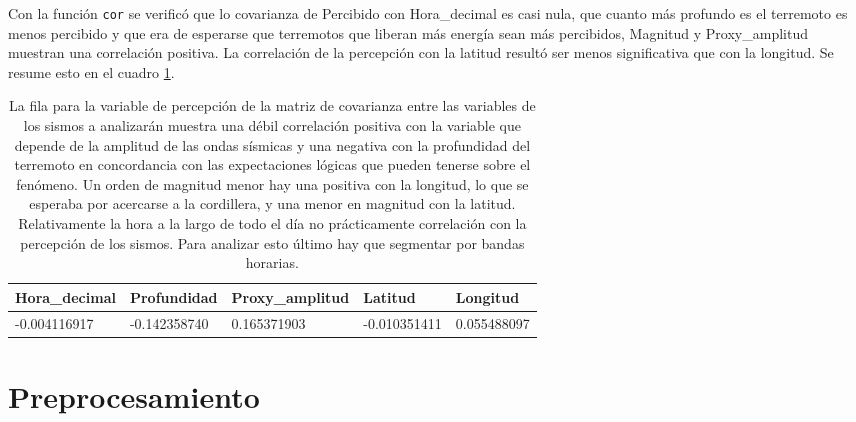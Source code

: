 \documentclass[a4paper]{report}
\begin{document}
Con la función \verb'cor' se verificó que lo covarianza de Percibido con Hora\_decimal es casi nula, que cuanto más profundo es el terremoto es menos percibido y que era de esperarse que terremotos que liberan más energía sean más percibidos, Magnitud y Proxy\_amplitud muestran una correlación positiva.
La correlación de la percepción con la latitud resultó ser menos significativa que con la longitud.
Se resume esto en el cuadro \ref{tab:correlaciones}.
\begin{table}[!ht]
		\begin{tabular}{lllll}
			\toprule
			Hora\_decimal & Profundidad  & Proxy\_amplitud & Latitud & Longitud \\ 
			\midrule
			-0.004116917 & -0.142358740 & 0.165371903 & -0.010351411 & 0.055488097\\ \bottomrule
		\end{tabular}
		\caption{La fila para la variable de percepción de la matriz de covarianza entre las variables de los sismos a analizarán muestra una débil correlación positiva con la variable que depende de la amplitud de las ondas sísmicas y una negativa con la profundidad del terremoto en concordancia con las expectaciones lógicas que pueden tenerse sobre el fenómeno.
		Un orden de magnitud menor hay una positiva con la longitud, lo que se esperaba por acercarse a la cordillera, y una menor en magnitud con la latitud.
		Relativamente la hora a la largo de todo el día no prácticamente correlación con la percepción de los sismos.
		Para analizar esto último hay que segmentar por bandas horarias. 
		}
		\label{tab:correlaciones}
\end{table}



\section{Preprocesamiento}
\end{document}
